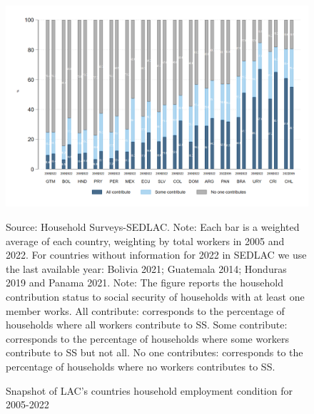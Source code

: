 \documentclass[english]{article}
\begin{document}
\begin{landscape}
\begin{figure}[!htb]
    \centering
    \caption{Snapshot of LAC’s countries household employment condition for 2005-2022}     
    \centerline{\includegraphics[scale=.45]{latex/figures/Household/snapshot_household_2005-2022.png}
    \label{fig:Household20052022}}
    \justifying
    \footnotesize{Source: Household Surveys-SEDLAC.}
    \footnotesize{Note: Each bar is a weighted average of each country, weighting by total workers in 2005 and 2022. For countries without information for 2022 in SEDLAC we use the last available year: Bolivia 2021; Guatemala 2014; Honduras 2019 and Panama 2021.}
    \footnotesize{Note: The figure reports the household contribution status to social security of households with at least one member works. All contribute: corresponds to the percentage of households where all workers contribute to SS. Some contribute: corresponds to the percentage of households where some workers contribute to SS but not all. No one contributes: corresponds to the percentage of households where no workers contributes to SS.}
\end{figure}
\end{landscape}
\end{document}
